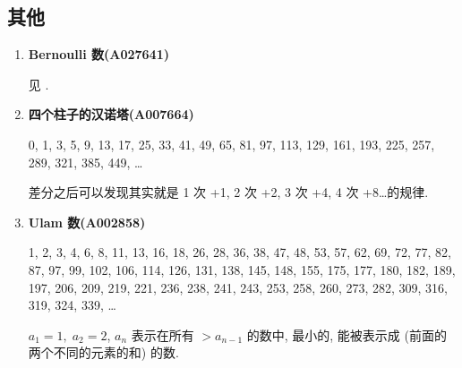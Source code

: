 \subsection{其他}

\begin{enumerate}
    \item \textbf{Bernoulli 数(A027641)}

          见 .

    \item \textbf{四个柱子的汉诺塔(A007664)}

          0, 1, 3, 5, 9, 13, 17, 25, 33, 41, 49, 65, 81, 97, 113, 129, 161, 193, 225, 257, 289, 321, 385, 449, \dots

          差分之后可以发现其实就是 1 次 +1, 2 次 +2, 3 次 +4, 4 次 +8\dots 的规律.

    \item \textbf{Ulam 数(A002858)}

          1, 2, 3, 4, 6, 8, 11, 13, 16, 18, 26, 28, 36, 38, 47, 48, 53, 57, 62, 69, 72, 77, 82, 87, 97, 99, 102, 106, 114, 126, 131, 138, 145, 148, 155, 175, 177, 180, 182, 189, 197, 206, 209, 219, 221, 236, 238, 241, 243, 253, 258, 260, 273, 282, 309, 316, 319, 324, 339, \dots

          \( a_1 = 1,\; a_2 = 2 \), \(a_n\) 表示在所有 \(>a_{n-1}\) 的数中, 最小的, 能被表示成 (前面的两个不同的元素的和) 的数.
\end{enumerate}

